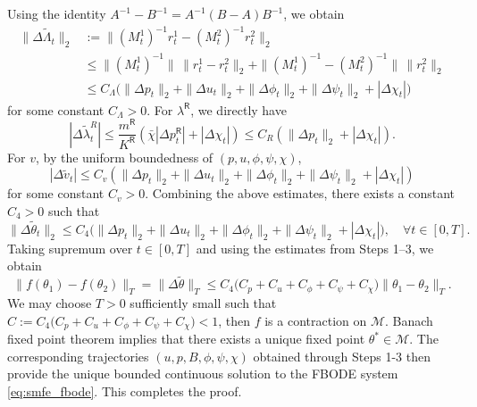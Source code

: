 \documentclass[letterpaper, 10 pt, conference]{ieeeconf}  %
\def\sR{\mathsf{R}}
\begin{document}
Using the identity $A^{-1}-B^{-1}=A^{-1}(B-A)B^{-1}$, we obtain
$$
\begin{aligned}
\|\Delta\tilde{\Lambda}_t\|_2
&:=\|(M_t^1)^{-1}r_t^1-(M_t^2)^{-1}r_t^2\|_2\\
&\leq \|(M_t^1)^{-1}\|\,\|r_t^1-r_t^2\|_2
+\|(M_t^1)^{-1}-(M_t^2)^{-1}\|\,\|r_t^2\|_2\\
&\leq C_{\Lambda}\big(\|\Delta p_t\|_2+\|\Delta u_t\|_2+\|\Delta\phi_t\|_2+\|\Delta\psi_t\|_2+|\Delta\chi_t|\big)
\end{aligned}
$$
for some constant $C_{\Lambda}>0$. For $\lambda^\sR$, we directly have
$$|\Delta\tilde\lambda_t^R|
\leq \frac{m^\sR}{K^\sR}(\bar{\chi}|\Delta p_t^\sR|+|\Delta\chi_t|)
\leq C_R(\|\Delta p_t\|_2+|\Delta\chi_t|).$$
For $v$, by the uniform boundedness of $(p,u,\phi,\psi,\chi)$,
$$|\Delta\tilde v_t|
\le C_v(\|\Delta p_t\|_2+\|\Delta u_t\|_2+\|\Delta\phi_t\|_2+\|\Delta\psi_t\|_2+|\Delta\chi_t|)$$
for some constant $C_v>0$. Combining the above estimates, there exists a constant $C_4>0$ such that
$$\|\Delta\tilde\theta_t\|_2
\le C_4\big(\|\Delta p_t\|_2+\|\Delta u_t\|_2+\|\Delta\phi_t\|_2+\|\Delta\psi_t\|_2+|\Delta\chi_t|\big),
\quad \forall t\in[0,T].$$
Taking supremum over $t\in[0,T]$ and using the estimates from Steps 1--3, we obtain
$$\|f(\theta_1)-f(\theta_2)\|_T
=\|\Delta\tilde\theta\|_T
\le C_4\big(C_p+C_u+C_\phi+C_\psi+C_\chi\big)\|\theta_1-\theta_2\|_T.$$
We may choose $T>0$ sufficiently small such that $C:=C_4\big(C_p+C_u+C_\phi+C_\psi+C_\chi\big)<1$, then $f$ is a contraction on $\mathcal{M}$. Banach fixed point theorem implies that there exists a unique fixed point $\theta^*\in \mathcal{M}$. The corresponding trajectories $(u,p,B,\phi,\psi,\chi)$ obtained through Steps 1-3 then provide the unique bounded continuous solution to the FBODE system \eqref{eq:smfe_fbode}. This completes the proof.
\end{document}
